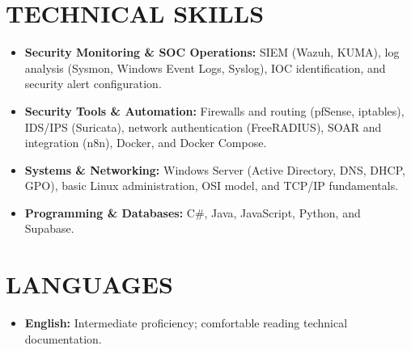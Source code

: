 \documentclass[10pt,a4paper]{article}
\begin{document}
\section*{TECHNICAL SKILLS}
\begin{itemize}[leftmargin=0.15in, label={}]
    \item \textbf{Security Monitoring \& SOC Operations:} SIEM (Wazuh, KUMA), log analysis (Sysmon, Windows Event Logs, Syslog), IOC identification, and security alert configuration.
    \item \textbf{Security Tools \& Automation:} Firewalls and routing (pfSense, iptables), IDS/IPS (Suricata), network authentication (FreeRADIUS), SOAR and integration (n8n), Docker, and Docker Compose.
    \item \textbf{Systems \& Networking:} Windows Server (Active Directory, DNS, DHCP, GPO), basic Linux administration, OSI model, and TCP/IP fundamentals.
    \item \textbf{Programming \& Databases:} C\#, Java, JavaScript, Python, and Supabase.
\end{itemize}

\section*{LANGUAGES}
\begin{itemize}[leftmargin=0.15in, label={}]
    \item \textbf{English:} Intermediate proficiency; comfortable reading technical documentation.
\end{itemize}
\end{document}
